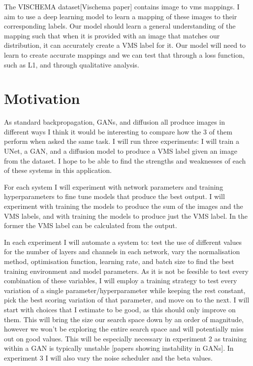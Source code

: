 \documentclass{UoYCSproject}
\begin{document}
The VISCHEMA dataset[Vischema paper] contains image to vms mappings. I aim to use a deep learning model to learn a mapping of these images to their corresponding labels. Our model should learn a general understanding of the mapping such that when it is provided with an image that matches our distribution, it can accurately create a VMS label for it. Our model will need to learn to create accurate mappings and we can test that through a loss function, such as L1, and through qualitative analysis.

\section{Motivation}

As standard backpropagation, GANs, and diffusion all produce images in different ways I think it would be interesting to compare how the 3 of them perform when asked the same task. I will run three experiments: I will train a UNet, a GAN, and a diffusion model to produce a VMS label given an image from the dataset. I hope to be able to find the strengths and weaknesses of each of these systems in this application.

For each system I will experiment with network parameters and training hyperparameters to fine tune models that produce the best output. I will experiment with training the models to produce the sum of the images and the VMS labels, and with training the models to produce just the VMS label. In the former the VMS label can be calculated from the output. 

In each experiment I will automate a system to: test the use of different values for the number of layers and channels in each network, vary the normalisation method, optimisation function, learning rate, and batch size to find the best training environment and model parameters. As it is not be feesible to test every combination of these variables, I will employ a training strategy to test every variation of a single parameter/hyperparameter while keeping the rest constant, pick the best scoring variation of that parameter, and move on to the next. I will start with choices that I estimate to be good, as this should only improve on them. This will bring the size our search space down by an order of magnitude, however we won't be exploring the entire search space and will potentially miss out on good values. This will be especially necessary in experiment 2 as training within a GAN is typically unstable [papers showing instability in GANs]. In experiment 3 I will also vary the noise scheduler and the beta values.
\end{document}
